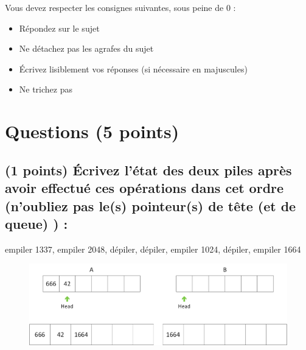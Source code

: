 \documentclass[11pt,a4paper]{article}
\begin{document}
\MakeExamTitle                   %


\bigskip
\bigskip

Vous devez respecter les consignes suivantes, sous peine de 0 :

\begin{itemize}
\item Répondez sur le sujet
\item Ne détachez pas les agrafes du sujet
\item \'Ecrivez lisiblement vos réponses (si nécessaire en majuscules)
\item Ne trichez pas
\end{itemize}

\bigskip


\section{Questions (5 points)}

\subsection{(1 points) \'Ecrivez l'état des deux piles après avoir effectué ces opérations dans cet ordre (n'oubliez pas le(s) pointeur(s) de tête (et de queue) ) : }

\bigskip

\vfill
\hspace{0pt}

\begin{center}

\begin{large}
empiler 1337, empiler 2048, dépiler, dépiler, empiler 1024, dépiler, empiler 1664
\end{large}


\bigskip

\begin{figure}[ht!]
\centering
\centerline{  %
\includegraphics[scale=1]{img/correction_Exercice1_pile.png}
}
\end{figure}

\end{center}
\end{document}
